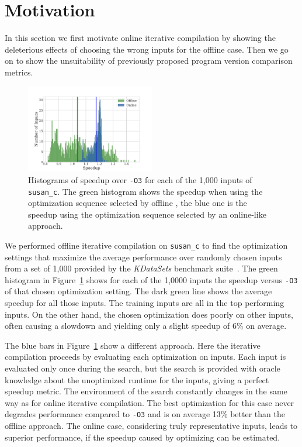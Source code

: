 \section{Motivation}

    In this section we first motivate online iterative compilation by showing the deleterious effects of choosing the wrong inputs for the
    offline case. Then we go on to show the unsuitability of previously proposed program version comparison metrics.

    \begin{figure}[t!]
        \centering
        \includegraphics[width=0.5\textwidth]{figs/motivation-online.pdf}
        \caption{
            Histograms of speedup over \texttt{-O3} for each of the 1,000 inputs of \texttt{susan\_c}. The green histogram shows the
            speedup when using the optimization sequence selected by offline \itercomp, the blue one is the speedup using the optimization
            sequence selected by an online-like approach. 
        }
        \label{fig:motivation-online}
    \end{figure}

    We performed offline iterative compilation on \texttt{susan\_c} to find the optimization settings that maximize the average performance
    over  randomly chosen inputs from a set of 1,000 provided by the \textit{KDataSets} benchmark
	suite~\cite{chen10,chen12a}. The green histogram in Figure~\ref{fig:motivation-online} shows for each of the 1,0000 inputs the speedup versus \texttt{-O3}
    of that chosen optimization setting. The dark green line shows the average speedup for all those inputs. The
     training inputs are all in the top  performing inputs. On the other hand, the chosen optimization does
    poorly on other inputs, often causing a slowdown and yielding only a slight speedup of 6\% on average.
    
    The blue bars in Figure~\ref{fig:motivation-online} show a different approach. Here the iterative compilation proceeds by evaluating
    each optimization on  inputs. Each input is evaluated only once during the search, but the search is provided with oracle
    knowledge about the unoptimized runtime for the inputs, giving a perfect speedup metric. The environment of the search constantly changes
    in the same way as for online iterative compilation. The best optimization for this case never degrades performance compared to
    \texttt{-O3} and is on average 13\% better than the offline approach. The online case, considering truly representative inputs, leads
	to superior performance, if the speedup caused by optimizing can be estimated. 

